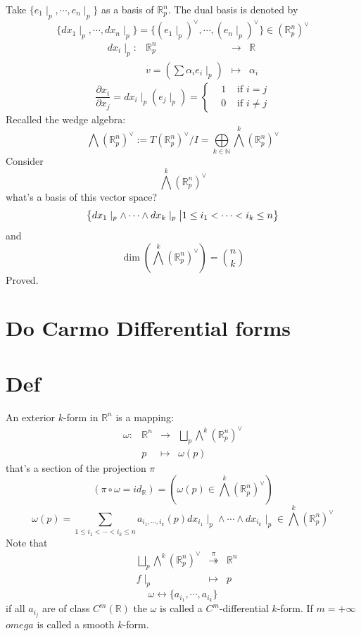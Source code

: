 \documentclass{book}
\begin{document}
Take $\{e_1\mid_p,\cdots,e_n\mid_p\}$ as a basis of $\mathbb{R}^n_p$. The dual basis is denoted by $$\{dx_1\mid_p,\cdots,dx_n\mid_p\}=\{(e_1\mid_p)^\vee,\cdots,(e_n\mid_p)^\vee\}\in (\mathbb{R}_p^n)^\vee$$
$$\begin{aligned}
    dx_i\mid_p: &\mathbb{R}^n_p &\rightarrow &\mathbb{R}\\
    &v=(\sum\alpha_ie_i\mid_p)&\mapsto &\alpha_i
\end{aligned}$$
$$\frac{\partial x_i}{\partial x_j}=dx_i\mid_p(e_j\mid_p)=\left\{\begin{aligned}
    &1&\text{ if }i=j\\
    &0&\text{ if }i\neq j
\end{aligned}\right.$$
Recalled the wedge algebra:
$$\bigwedge(\mathbb{R}^n_p)^\vee:=T(\mathbb{R}^n_p)^\vee/I=\bigoplus\limits_{k\in \mathbb{N}}\bigwedge\limits^k(\mathbb{R}_p^n)^\vee$$
Consider $$\bigwedge\limits^k(\mathbb{R}_p^n)^\vee$$
what's a basis of this vector space?
$$\left\{dx_1\mid_p\wedge\cdots\wedge dx_k\mid_p\textbf{\big|}1\leq i_1<\cdots< i_k\leq n\right\}$$
and $$\dim(\bigwedge\limits^k(\mathbb{R}_p^n)^\vee)={n\choose k}$$
Proved.
\section{Do Carmo Differential forms}
\section{Def}
An exterior $k$-form in $\mathbb{R}^n$ is a mapping:
$$\begin{aligned}
    \omega: &\mathbb{R}^n &\rightarrow &\bigsqcup\limits_{p}\bigwedge\limits^k(\mathbb{R}_p^n)^\vee\\
    &p&\mapsto&\omega(p)
\end{aligned}$$
that's a section of the projection $\pi$
$$(\pi\circ \omega=id_\mathbb{R})=(\omega(p)\in \bigwedge\limits^k(\mathbb{R}^n_p)^\vee)$$
$$\omega(p)=\sum\limits_{1\leq i_1<\cdots<i_k\leq n}a_{i_1,\cdots,i_k}(p)dx_{i_1}\mid_p\wedge\cdots\wedge dx_{i_k}\mid_p\in \bigwedge\limits^k(\mathbb{R}_p^n)^\vee$$
Note that
$$\begin{aligned}
    &\bigsqcup\limits_{p}\bigwedge\limits^k(\mathbb{R}_p^n)^\vee&\stackrel{\pi}{\twoheadrightarrow}&\mathbb{R}^n\\
    &f\mid_p&\mapsto&p 
\end{aligned}$$
$$\omega\leftrightarrow\{a_{i_1},\cdots,a_{i_k}\}$$
if all $a_{i_j}$ are of class $C^m(\mathbb{R})$ the $\omega$ is called a $C^m$-differential $k$-form. If $m=+\infty$ $omega$ is called a smooth $k$-form.
\end{document}
